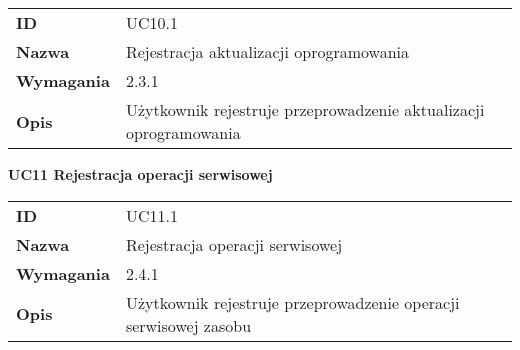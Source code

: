 \begin{tabular}{p{}p{}}
\hfill {\bf ID} & UC10.1 \\
\hfill {\bf Nazwa} & Rejestracja aktualizacji oprogramowania \\
\hfill {\bf Wymagania} & 2.3.1 \\
\hfill {\bf Opis} & Użytkownik rejestruje przeprowadzenie aktualizacji oprogramowania \\
\end{tabular}

\vspace{.03\textheight}
\begin{center}
  {\Large\bf UC11 Rejestracja operacji serwisowej} \\
\end{center}
\vspace{.02\textheight}

\begin{tabular}{p{}p{}}
\hfill {\bf ID} & UC11.1 \\
\hfill {\bf Nazwa} &  Rejestracja operacji serwisowej \\
\hfill {\bf Wymagania} &  2.4.1 \\
\hfill {\bf Opis} & Użytkownik rejestruje przeprowadzenie operacji serwisowej zasobu  \\
\end{tabular}

